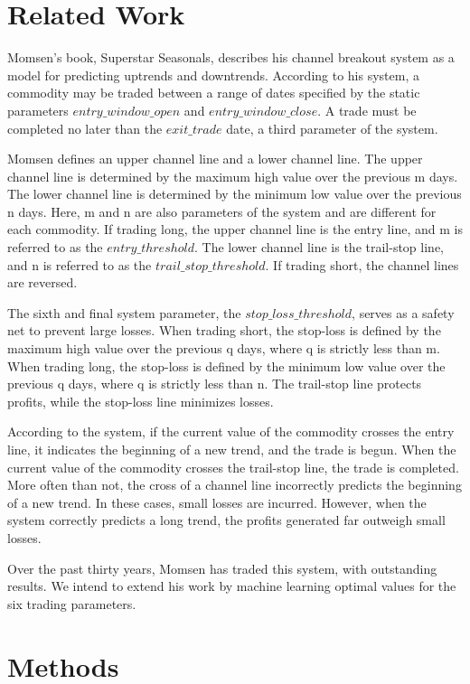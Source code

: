 \documentclass[10pt]{article}
\begin{document}
\section{Related Work}

Momsen's book, Superstar Seasonals, describes his channel breakout system as a
model for predicting uptrends and downtrends.  According to his system, a
commodity may be traded between a range of dates specified by the static
parameters $entry\_window\_open$ and $entry\_window\_close$.  A trade must be
completed no later than the $exit\_trade$ date, a third parameter of the
system.

Momsen defines an upper channel line and a lower channel line.  The upper
channel line is determined by the maximum high value over the previous m days.
The lower channel line is determined by the minimum low value over the previous
n days.  Here, m and n are also parameters of the system and are different for
each commodity.  If trading long, the upper channel line is the entry line, and
m is referred to as the $entry\_threshold$. The lower channel line is the
trail-stop line, and n is referred to as the $trail\_stop\_threshold$.  If
trading short, the channel lines are reversed.

The sixth and final system parameter, the $stop\_loss\_threshold$, serves as a
safety net to prevent large losses.  When trading short, the stop-loss is
defined by the maximum high value over the previous q days, where q is
strictly less than m.  When trading long, the stop-loss is defined by the
minimum low value over the previous q days, where q is strictly less than
n.  The trail-stop line protects profits, while the stop-loss line minimizes
losses.

According to the system, if the current value of the commodity crosses the entry
line, it indicates the beginning of a new trend, and the trade is begun.  When
the current value of the commodity crosses the trail-stop line, the trade is
completed.  More often than not, the cross of a channel line incorrectly
predicts the beginning of a new trend.  In these cases, small losses are incurred.
However, when the system correctly predicts a long trend, the profits generated
far outweigh small losses.

Over the past thirty years, Momsen has traded this system, with outstanding
results.  We intend to extend his work by machine learning optimal values for
the six trading parameters.


\section{Methods}
\end{document}
